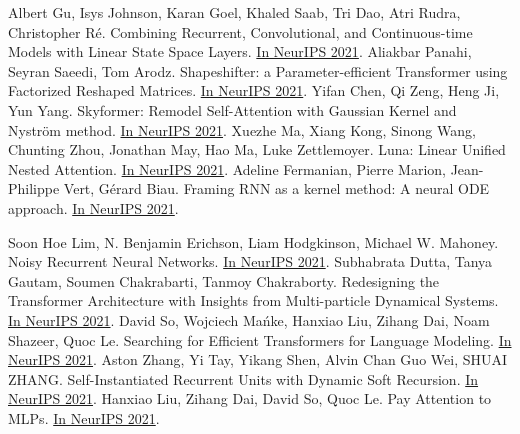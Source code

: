 \documentclass[b5paper,xelatex,ja=standard,10pt]{bxjsarticle}
\begin{document}
\clearpage
{}
\begin{thebibliography}{99}
     Albert Gu, Isys Johnson, Karan Goel, Khaled Saab, Tri Dao, Atri Rudra, Christopher Ré. Combining Recurrent, Convolutional, and Continuous-time Models with Linear State Space Layers. {\href{https://proceedings.neurips.cc/paper/2021/hash/05546b0e38ab9175cd905eebcc6ebb76-Abstract.html}{In NeurIPS 2021}}.
     Aliakbar Panahi, Seyran Saeedi, Tom Arodz. Shapeshifter: a Parameter-efficient Transformer using Factorized Reshaped Matrices. {\href{https://proceedings.neurips.cc/paper/2021/hash/09def3ebbc44ff3426b28fcd88c83554-Abstract.html}{In NeurIPS 2021}}.
     Yifan Chen, Qi Zeng, Heng Ji, Yun Yang. Skyformer: Remodel Self-Attention with Gaussian Kernel and Nyström method. {\href{https://proceedings.neurips.cc/paper/2021/hash/10a7cdd970fe135cf4f7bb55c0e3b59f-Abstract.html}{In NeurIPS 2021}}.
     Xuezhe Ma, Xiang Kong, Sinong Wang, Chunting Zhou, Jonathan May, Hao Ma, Luke Zettlemoyer. Luna: Linear Unified Nested Attention. {\href{https://proceedings.neurips.cc/paper/2021/hash/14319d9cfc6123106878dc20b94fbaf3-Abstract.html}{In NeurIPS 2021}}.
     Adeline Fermanian, Pierre Marion, Jean-Philippe Vert, Gérard Biau. Framing RNN as a kernel method: A neural ODE approach. {\href{https://proceedings.neurips.cc/paper/2021/hash/18a9042b3fc5b02fe3d57fea87d6992f-Abstract.html}{In NeurIPS 2021}}.

     Soon Hoe Lim, N. Benjamin Erichson, Liam Hodgkinson, Michael W. Mahoney. Noisy Recurrent Neural Networks. {\href{https://proceedings.neurips.cc/paper/2021/hash/29301521774ff3cbd26652b2d5c95996-Abstract.html}{In NeurIPS 2021}}.
     Subhabrata Dutta, Tanya Gautam, Soumen Chakrabarti, Tanmoy Chakraborty. Redesigning the Transformer Architecture with Insights from Multi-particle Dynamical Systems. {\href{https://proceedings.neurips.cc/paper/2021/hash/2bd388f731f26312bfc0fe30da009595-Abstract.html}{In NeurIPS 2021}}.
     David So, Wojciech Mańke, Hanxiao Liu, Zihang Dai, Noam Shazeer, Quoc Le. Searching for Efficient Transformers for Language Modeling. {\href{https://proceedings.neurips.cc/paper/2021/hash/2f3c6a4cd8af177f6456e7e51a916ff3-Abstract.html}{In NeurIPS 2021}}.
     Aston Zhang, Yi Tay, Yikang Shen, Alvin Chan Guo Wei, SHUAI ZHANG. Self-Instantiated Recurrent Units with Dynamic Soft Recursion. {\href{https://proceedings.neurips.cc/paper/2021/hash/3341f6f048384ec73a7ba2e77d2db48b-Abstract.html}{In NeurIPS 2021}}.
     Hanxiao Liu, Zihang Dai, David So, Quoc Le. Pay Attention to MLPs. {\href{https://proceedings.neurips.cc/paper/2021/hash/4cc05b35c2f937c5bd9e7d41d3686fff-Abstract.html}{In NeurIPS 2021}}.


\end{thebibliography}
\end{document}
